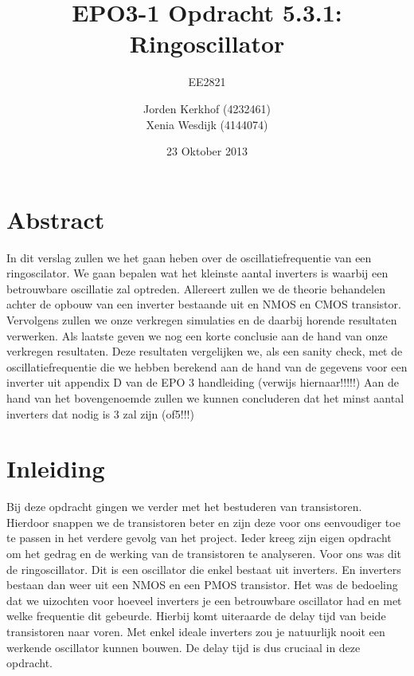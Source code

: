 \documentclass{scrartcl}  %
\author{Jorden {Kerkhof} (4232461)  \\{Xenia Wesdijk} (4144074)}
\title{EPO3-1   Opdracht 5.3.1: Ringoscillator}
\subtitle{EE2821}
\date{23 Oktober 2013}
\begin{document}
\maketitle
\vspace{80 mm}
\section*{Abstract}
In dit verslag zullen we het gaan heben over de oscillatiefrequentie van een ringoscilator. We gaan bepalen wat het kleinste aantal inverters is waarbij een betrouwbare oscillatie zal optreden.
Allereert zullen we de theorie behandelen achter de opbouw van een inverter bestaande uit en NMOS en CMOS transistor. 
Vervolgens zullen we onze verkregen simulaties en de daarbij horende resultaten verwerken. Als laatste geven we nog een korte conclusie aan de hand van onze verkregen resultaten. Deze resultaten vergelijken we, als een sanity check,
met de oscillatiefrequentie die we hebben berekend aan de hand van de gegevens voor een inverter uit appendix D van de EPO 3 handleiding (verwijs hiernaar!!!!!)
Aan de hand van het bovengenoemde zullen we kunnen concluderen dat het minst aantal inverters dat nodig is 3 zal zijn (of5!!!)



\newpage
\setlength{\cftbeforetoctitleskip}{-3em}
\tableofcontents
\newpage
\section{Inleiding}
Bij deze opdracht gingen we verder met het bestuderen van transistoren. Hierdoor snappen we de transistoren beter en zijn deze voor ons eenvoudiger toe te passen in het verdere gevolg van het project. Ieder kreeg zijn eigen opdracht om het gedrag en de werking van de transistoren te analyseren. Voor ons was dit de ringoscillator. Dit is een oscillator die enkel bestaat uit inverters. En inverters bestaan dan weer uit een NMOS en een PMOS transistor. Het was de bedoeling dat we uizochten voor hoeveel inverters je een betrouwbare oscillator had en met welke frequentie dit gebeurde. Hierbij komt uiteraarde de delay tijd van beide transistoren naar voren. Met enkel ideale inverters zou je natuurlijk nooit een werkende oscillator kunnen bouwen. De delay tijd is dus cruciaal in deze opdracht.  
\end{document}

